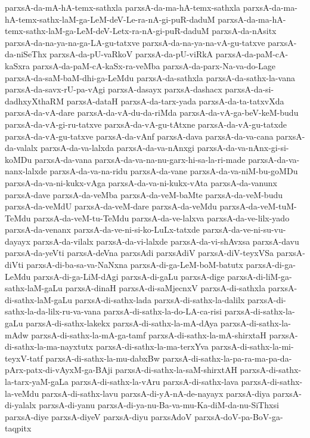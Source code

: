 {parxsA-da-mA-hA-temx-sathxla
parxsA-da-ma-hA-temx-sathxla
parxsA-da-ma-hA-temx-sathx-laM-ga-LeM-deV-Le-ra-nA-gi-puR-daduM
parxsA-da-ma-hA-temx-sathx-laM-ga-LeM-deV-Letx-ra-nA-gi-puR-daduM
parxsA-da-nAsitx
parxsA-da-na-ya-na-ga-LA-gu-tatxve
parxsA-da-na-ya-na-vA-gu-tatxve
parxsA-da-niSeThx
parxsA-da-pU-vaRkoV
parxsA-da-pU-viRkA
parxsA-da-paM-cA-kaSxra
parxsA-da-paM-cA-kaSx-ra-veMba
parxsA-da-parx-Na-va-do-Lage
parxsA-da-saM-baM-dhi-ga-LeMdu
parxsA-da-sathxla
parxsA-da-sathx-la-vana
parxsA-da-savx-rU-pa-vAgi
parxsA-dasayx
parxsA-dashacx
parxsA-da-si-dadhxyXthaRM
parxsA-dataH
parxsA-da-tarx-yada
parxsA-da-ta-tatxvXda
parxsA-da-vA-dare
parxsA-da-vA-du-da-riMda
parxsA-da-vA-ga-beV-keM-budu
parxsA-da-vA-gi-ru-tatxve
parxsA-da-vA-gu-tAtxne
parxsA-da-vA-gu-tatxde
parxsA-da-vA-gu-tatxve
parxsA-da-vAnf
parxsA-dava
parxsA-da-va-cana
parxsA-da-valalx
parxsA-da-va-lalxda
parxsA-da-va-nAnxgi
parxsA-da-va-nAnx-gi-si-koMDu
parxsA-da-vana
parxsA-da-va-na-nu-garx-hi-sa-la-ri-made
parxsA-da-va-nanx-lalxde
parxsA-da-va-na-ridu
parxsA-da-vane
parxsA-da-va-niM-bu-goMDu
parxsA-da-va-ni-kukx-vAga
parxsA-da-va-ni-kukx-vAta
parxsA-da-vanunx
parxsA-dave
parxsA-da-veMba
parxsA-da-veM-baMte
parxsA-da-veM-budu
parxsA-da-veMdU
parxsA-da-veM-dare
parxsA-da-veMdu
parxsA-da-veM-tuM-TeMdu
parxsA-da-veM-tu-TeMdu
parxsA-da-ve-lalxva
parxsA-da-ve-lilx-yado
parxsA-da-venanx
parxsA-da-ve-ni-si-ko-LuLx-tatxde
parxsA-da-ve-ni-su-vu-dayayx
parxsA-da-vilalx
parxsA-da-vi-lalxde
parxsA-da-vi-shAvxsa
parxsA-davu
parxsA-da-yeVti
parxsA-deVna
parxsAdi
parxsAdiV
parxsA-diV-teyxVSa
parxsA-diVti
parxsA-di-ba-sa-va-NaNxna
parxsA-di-ga-LeM-boM-batutx
parxsA-di-ga-LeMdu
parxsA-di-ga-LiM-dAgi
parxsA-di-gaLu
parxsA-dige
parxsA-di-liM-ga-sathx-laM-gaLu
parxsA-dinaH
parxsA-di-saMjecnxV
parxsA-di-sathxla
parxsA-di-sathx-laM-gaLu
parxsA-di-sathx-lada
parxsA-di-sathx-la-dalilx
parxsA-di-sathx-la-da-lilx-ru-va-vana
parxsA-di-sathx-la-do-LA-ca-risi
parxsA-di-sathx-la-gaLu
parxsA-di-sathx-lakekx
parxsA-di-sathx-la-mA-dAya
parxsA-di-sathx-la-mAdw
parxsA-di-sathx-la-mA-ga-tamf
parxsA-di-sathx-la-mA-shirxtaH
parxsA-di-sathx-la-ma-nayxtutx
parxsA-di-sathx-la-ma-terxYva
parxsA-di-sathx-la-mi-teyxV-tatf
parxsA-di-sathx-la-mu-dabxBw
parxsA-di-sathx-la-pa-ra-ma-pa-da-pArx-patx-di-vAyxM-ga-BAji
parxsA-di-sathx-la-saM-shirxtAH
parxsA-di-sathx-la-tarx-yaM-gaLa
parxsA-di-sathx-la-vAru
parxsA-di-sathx-lava
parxsA-di-sathx-la-veMdu
parxsA-di-sathx-lavu
parxsA-di-yA-nA-de-nayayx
parxsA-diya
parxsA-di-yalalx
parxsA-di-yanu
parxsA-di-ya-nu-Ba-va-mu-Ka-diM-da-nu-SiThxsi
parxsA-diye
parxsA-diyeV
parxsA-diyu
parxsAdoV
parxsA-doV-pa-BoV-ga-taqpitx
}
